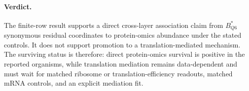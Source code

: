 \paragraph{Verdict.}
The finite-row result supports a direct cross-layer association claim from $B^{*}_{Q6}$ synonymous residual coordinates to protein-omics abundance under the stated controls.  It does not support promotion to a translation-mediated mechanism.  The surviving status is therefore: direct protein-omics survival is positive in the reported organisms, while translation mediation remains data-dependent and must wait for matched ribosome or translation-efficiency readouts, matched mRNA controls, and an explicit mediation fit.

